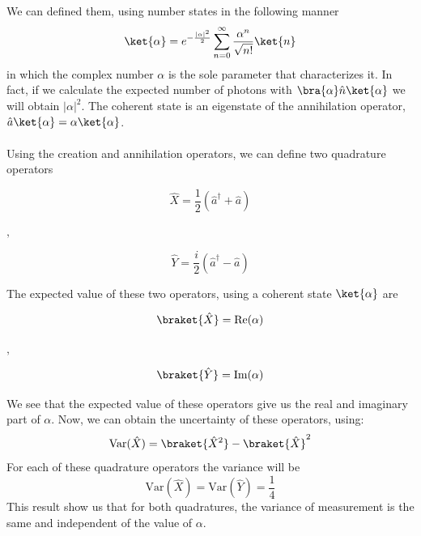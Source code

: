 \cite{loudon2000}
We can defined them, using number states in the following manner
\begin{equation}
\ket{\alpha} = e^{-\frac{|\alpha|^2}{2}} \sum_{n=0}^\infty \frac{\alpha^n}{\sqrt{n!}} \ket{n}
\end{equation}
in which the complex number $\alpha$ is the sole parameter that characterizes it.
In fact, if we calculate the expected number of photons with $\bra{\alpha} \hat{n} \ket{\alpha}$ we will obtain $|\alpha|^2$. The coherent state is an eigenstate of the annihilation operator, $\hat{a}\ket{\alpha} = \alpha \ket{\alpha}$.\\
\\
%
%
Using the creation and annihilation operators, we can define two quadrature operators
\cite{loudon2000}
%
\begin{center}
	\begin{minipage}{41mm}
		\noindent
		\begin{equation}
			\hat{X} = \frac{1}{2} \left( \hat{a}^\dagger + \hat{a} \right)
		\end{equation}
	\end{minipage}
	$,\quad$
	\begin{minipage}{40mm}
		\noindent
		\begin{equation}
			\hat{Y} = \frac{i}{2} \left( \hat{a}^\dagger - \hat{a} \right)
		\end{equation}
	\end{minipage}
\end{center}
%
The expected value of these two operators, using a coherent state $\ket{\alpha}$ are
%
\begin{center}
	\begin{minipage}{37mm}
		\noindent
		\begin{equation}
			\braket{\hat{X}} = \textrm{Re}(\alpha)
		\end{equation}
	\end{minipage}
	$,\quad$
	\begin{minipage}{37mm}
		\noindent
		\begin{equation}
			\braket{\hat{Y}} = \textrm{Im}(\alpha)
		\end{equation}
	\end{minipage}
\end{center}
%
We see that the expected value of these operators give us the real and imaginary part of $\alpha$. Now, we can obtain the uncertainty of these operators, using:
%
\begin{equation}
\textrm{Var}(\hat{X}) = \braket{\hat{X}^2} - \braket{\hat{X}}^2
\end{equation}
%
For each of these quadrature operators the variance will be
%
\begin{equation}
\textrm{Var}(\hat{X}) = \textrm{Var}(\hat{Y}) = \frac{1}{4}
\end{equation}
%
This result show us that for both quadratures, the variance of measurement is the same and independent of the value of $\alpha$.
%
%
%
